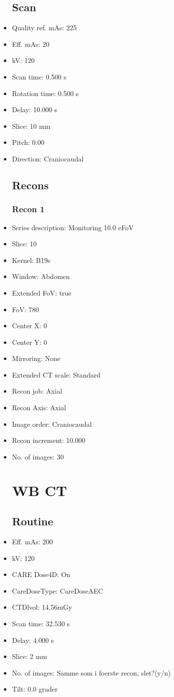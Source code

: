 \documentclass[12pt]{article}
\begin{document}
\begin{itemize}
\subsection{Scan}
\item Quality ref. mAs: 225\item Eff. mAs: 20\item kV: 120\item Scan time: 0.500 s\item Rotation time: 0.500 s\item Delay: 10.000 s\item Slice: 10 mm\item Pitch: 0.00\item Direction: Craniocaudal\subsection{Recons}

\subsubsection{Recon 1}
\item Series description: Monitoring 10.0 eFoV
\item Slice: 10
\item Kernel: B19s
\item Window: Abdomen
\item Extended FoV: true
\item FoV: 780
\item Center X: 0
\item Center Y: 0
\item Mirroring: None
\item Extended CT scale: Standard
\item Recon job: Axial
\item Recon Axis: Axial
\item Image order: Craniocaudal
\item Recon increment: 10.000
\item No. of images: 30
\section{WB CT}
\subsection{Routine}
\item Eff. mAs: 200\item kV: 120\item CARE Dose4D: On\item CareDoseType: CareDoseAEC\item CTDlvol: 14.56mGy\item Scan time: 32.530 s\item Delay: 4.000 s\item Slice: 2 mm\item No. of images: Samme som i foerste recon, slet?(y/n)\item Tilt: 0.0 grader

\end{itemize}
\end{document}
